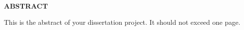 \newpage
{}

\centerline{\bf \large ABSTRACT}
\vspace{10mm} %
This is the abstract of your dissertation project.  It should
not exceed one page.
